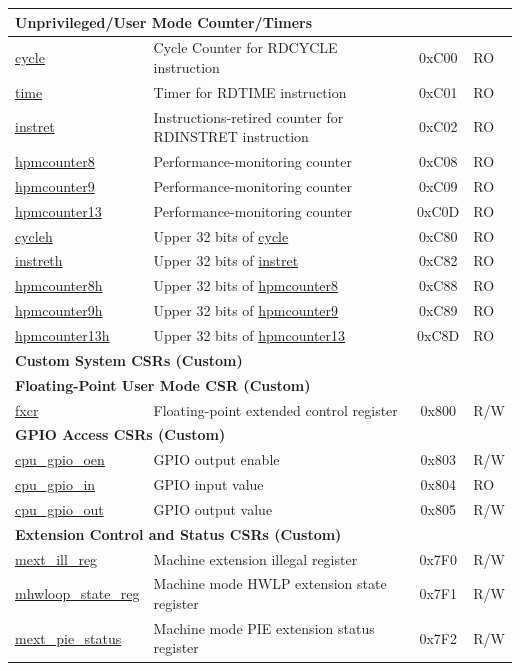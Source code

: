 \begin{longtable}{ | p{4.0cm} | p{8.4cm} | c | l | }
\multicolumn{4}{|l|}{\textbf{Unprivileged/User Mode Counter/Timers }} \\\hline 
\hyperref[regdesc:CYCLE]{cycle} & Cycle Counter for RDCYCLE instruction & 0xC00 & RO\\\hline
\hyperref[regdesc:TIME]{time} & Timer for RDTIME instruction & 0xC01 & RO \\\hline
\hyperref[regdesc:INSTRET]{instret} & Instructions-retired counter for RDINSTRET instruction & 0xC02 & RO \\\hline
\hyperref[regdesc:HPMCOUNTER8]{hpmcounter8} & Performance-monitoring counter & 0xC08 & RO \\\hline
\hyperref[regdesc:HPMCOUNTER9]{hpmcounter9} & Performance-monitoring counter & 0xC09 & RO \\\hline
\hyperref[regdesc:HPMCOUNTER13]{hpmcounter13} & Performance-monitoring counter & 0xC0D & RO \\\hline
\hyperref[regdesc:CYCLEH]{cycleh} & Upper 32 bits of \hyperref[regdesc:CYCLE]{cycle} & 0xC80 & RO \\\hline
\hyperref[regdesc:INSTRETH]{instreth} & Upper 32 bits of \hyperref[regdesc:INSTRET]{instret}  & 0xC82 & RO \\\hline
\hyperref[regdesc:HPMCOUNTER8H]{hpmcounter8h} & Upper 32 bits of \hyperref[regdesc:HPMCOUNTER8]{hpmcounter8} & 0xC88 & RO \\\hline
\hyperref[regdesc:HPMCOUNTER9H]{hpmcounter9h} & Upper 32 bits of \hyperref[regdesc:HPMCOUNTER9]{hpmcounter9} & 0xC89 & RO \\\hline
\hyperref[regdesc:HPMCOUNTER13H]{hpmcounter13h} & Upper 32 bits of \hyperref[regdesc:HPMCOUNTER13]{hpmcounter13} & 0xC8D & RO \\\hline

\multicolumn{4}{|l|}{\textbf{Custom System CSRs (Custom)}} \\\hline
\multicolumn{4}{|l|}{\textbf{Floating-Point User Mode CSR (Custom)}} \\\hline
\hyperref[regdesc:FXCR]{fxcr} & Floating-point extended control register & 0x800 & R/W \\\hline
\multicolumn{4}{|l|}{\textbf{GPIO Access CSRs (Custom)}} \\\hline
\hyperref[regdesc:GPIO_OEN]{cpu\_gpio\_oen} & GPIO output enable & 0x803 & R/W \\\hline
\hyperref[regdesc:GPIO_IN]{cpu\_gpio\_in} & GPIO input value & 0x804 & RO \\\hline
\hyperref[regdesc:GPIO_OUT]{cpu\_gpio\_out} & GPIO output value & 0x805 & R/W \\\hline
\multicolumn{4}{|l|}{\textbf{Extension Control and Status CSRs (Custom)}} \\\hline
\hyperref[sec:riscvcpu-hwloop-reg-desc]{mext\_ill\_reg} & Machine extension illegal register & 0x7F0 & R/W \\\hline
\hyperref[sec:riscvcpu-hwloop-reg-desc]{mhwloop\_state\_reg} & Machine mode HWLP extension state register & 0x7F1 & R/W \\\hline
\hyperref[regdesc:MEXT_PIE_STATUS]{mext\_pie\_status} & Machine mode PIE extension status register & 0x7F2 & R/W \\\hline


\end{longtable}
